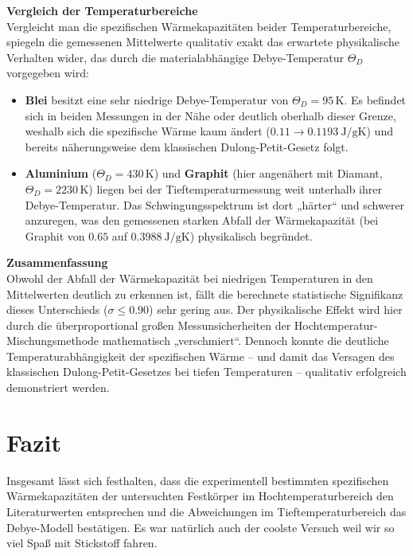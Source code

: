 \documentclass[12pt,a4paper,titlepage]{scrartcl}
\numberwithin{equation}{section}
\numberwithin{table}{section}
\numberwithin{figure}{section}
\begin{document}
\textbf{Vergleich der Temperaturbereiche} \\
Vergleicht man die spezifischen Wärmekapazitäten beider Temperaturbereiche, spiegeln die gemessenen Mittelwerte qualitativ exakt das erwartete physikalische Verhalten wider, das durch die materialabhängige Debye-Temperatur $\Theta_D$ vorgegeben wird:
\begin{itemize}
    \item \textbf{Blei} besitzt eine sehr niedrige Debye-Temperatur von $\Theta_{D} = 95\,\mathrm{K}$. Es befindet sich in beiden Messungen in der Nähe oder deutlich oberhalb dieser Grenze, weshalb sich die spezifische Wärme kaum ändert ($0.11 \rightarrow \qty{0.1193}{\joule\per\gram\kelvin}$) und bereits näherungsweise dem klassischen Dulong-Petit-Gesetz folgt.
    \item \textbf{Aluminium} ($\Theta_D = 430\,\mathrm{K}$) und \textbf{Graphit} (hier angenähert mit Diamant, $\Theta_D = 2230\,\mathrm{K}$) liegen bei der Tieftemperaturmessung weit unterhalb ihrer Debye-Temperatur. Das Schwingungsspektrum ist dort „härter“ und schwerer anzuregen, was den gemessenen starken Abfall der Wärmekapazität (bei Graphit von $0.65$ auf $\qty{0.3988}{\joule\per\gram\kelvin}$) physikalisch begründet.
\end{itemize}

\textbf{Zusammenfassung} \\
Obwohl der Abfall der Wärmekapazität bei niedrigen Temperaturen in den Mittelwerten deutlich zu erkennen ist, fällt die berechnete statistische Signifikanz dieses Unterschieds ($\sigma \le 0.90$) sehr gering aus. Der physikalische Effekt wird hier durch die überproportional großen Messunsicherheiten der Hochtemperatur-Mischungsmethode mathematisch „verschmiert“. Dennoch konnte die deutliche Temperaturabhängigkeit der spezifischen Wärme – und damit das Versagen des klassischen Dulong-Petit-Gesetzes bei tiefen Temperaturen – qualitativ erfolgreich demonstriert werden.

\section{Fazit}
Insgesamt lässt sich festhalten, dass die experimentell bestimmten spezifischen Wärmekapazitäten der untersuchten Festkörper im Hochtemperaturbereich den Literaturwerten entsprechen und die Abweichungen im Tieftemperaturbereich das Debye-Modell bestätigen. Es war natürlich auch der coolste Versuch weil wir so viel Spaß mit Stickstoff fahren. 
\end{document}

